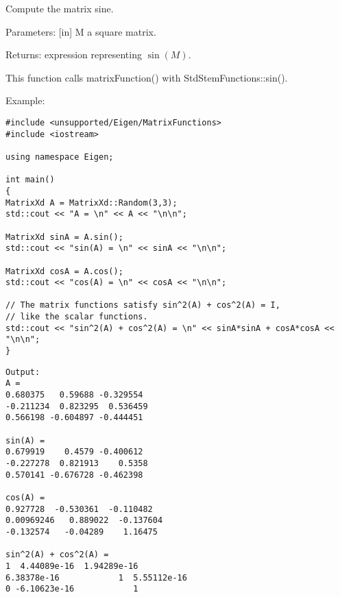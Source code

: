 %

\vspace{0.3cm}
Compute the matrix sine.

Parameters:
[in] M a square matrix.  

Returns:
expression representing $\sin(M)$.

This function calls matrixFunction() with StdStemFunctions::sin().

Example:


\begin{lstlisting}
#include <unsupported/Eigen/MatrixFunctions>
#include <iostream>

using namespace Eigen;

int main()
{
MatrixXd A = MatrixXd::Random(3,3);
std::cout << "A = \n" << A << "\n\n";

MatrixXd sinA = A.sin();
std::cout << "sin(A) = \n" << sinA << "\n\n";

MatrixXd cosA = A.cos();
std::cout << "cos(A) = \n" << cosA << "\n\n";

// The matrix functions satisfy sin^2(A) + cos^2(A) = I,   
// like the scalar functions. 
std::cout << "sin^2(A) + cos^2(A) = \n" << sinA*sinA + cosA*cosA << "\n\n";
}
\end{lstlisting}

\begin{verbatim}
Output:
A = 
0.680375   0.59688 -0.329554
-0.211234  0.823295  0.536459
0.566198 -0.604897 -0.444451

sin(A) = 
0.679919    0.4579 -0.400612
-0.227278  0.821913    0.5358
0.570141 -0.676728 -0.462398

cos(A) = 
0.927728  -0.530361  -0.110482
0.00969246   0.889022  -0.137604
-0.132574   -0.04289    1.16475

sin^2(A) + cos^2(A) = 
1  4.44089e-16  1.94289e-16
6.38378e-16            1  5.55112e-16
0 -6.10623e-16            1

\end{verbatim}



